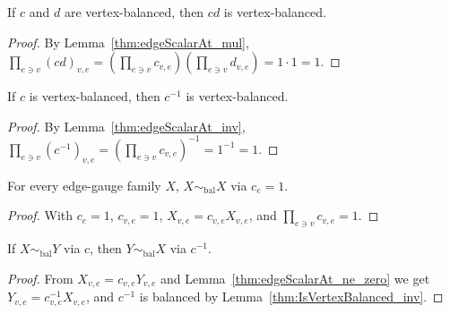 \begin{lemma}%
    \label{thm:IsVertexBalanced_mul}
    \leanok
    If $c$ and $d$ are vertex-balanced, then $cd$ is vertex-balanced.
\end{lemma}
\begin{proof}\leanok
    By Lemma~\ref{thm:edgeScalarAt_mul},
    $\prod_{e\ni v}(cd)_{v,e}=(\prod_{e\ni v}c_{v,e})(\prod_{e\ni v}d_{v,e})=1\cdot 1=1$.
\end{proof}

\begin{lemma}%
    \label{thm:IsVertexBalanced_inv}
    \leanok
    If $c$ is vertex-balanced, then $c^{-1}$ is vertex-balanced.
\end{lemma}
\begin{proof}\leanok
    By Lemma~\ref{thm:edgeScalarAt_inv},
    $\prod_{e\ni v}(c^{-1})_{v,e}=(\prod_{e\ni v}c_{v,e})^{-1}=1^{-1}=1$.
\end{proof}

\begin{lemma}%
    \label{thm:GaugeEquivModEdgeScalars_refl}
    \leanok
    For every edge-gauge family $X$, $X\sim_{\mathrm{bal}}X$ via $c_e=1$.
\end{lemma}
\begin{proof}\leanok
    With $c_e=1$, $c_{v,e}=1$, $X_{v,e}=c_{v,e}X_{v,e}$, and
    $\prod_{e\ni v}c_{v,e}=1$.
\end{proof}

\begin{lemma}%
    \label{thm:GaugeEquivModEdgeScalars_symm}
    \leanok
    If $X\sim_{\mathrm{bal}}Y$ via $c$, then $Y\sim_{\mathrm{bal}}X$ via $c^{-1}$.
\end{lemma}
\begin{proof}\leanok
    From $X_{v,e}=c_{v,e}Y_{v,e}$ and Lemma~\ref{thm:edgeScalarAt_ne_zero} we
    get $Y_{v,e}=c_{v,e}^{-1}X_{v,e}$, and $c^{-1}$ is balanced by
    Lemma~\ref{thm:IsVertexBalanced_inv}.
\end{proof}

